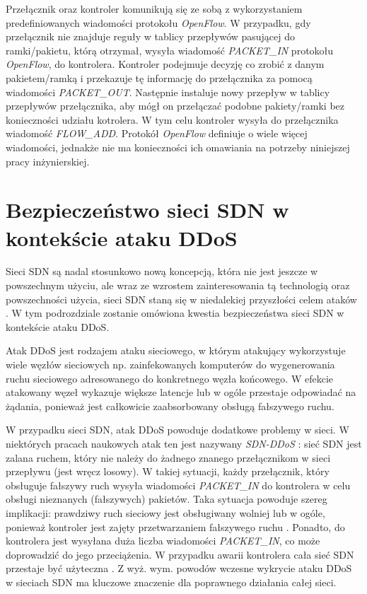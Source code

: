 Przełącznik oraz kontroler komunikują się ze sobą z wykorzystaniem
predefiniowanych wiadomości protokołu \textit{OpenFlow}. W przypadku, gdy
przełącznik nie znajduje reguły w tablicy przepływów pasującej do ramki/pakietu,
którą otrzymał, wysyła wiadomość \textit{PACKET\_IN} protokołu
\textit{OpenFlow}, do kontrolera. Kontroler podejmuje decyzję co zrobić z danym 
pakietem/ramką i przekazuje tę informację do przełącznika za pomocą wiadomości
\textit{PACKET\_OUT}. Następnie instaluje nowy przepływ w tablicy przepływów
przełącznika, aby mógł on przełączać podobne pakiety/ramki bez konieczności
udziału kotrolera. W tym celu kontroler wysyła do przełącznika wiadomość
\textit{FLOW\_ADD}. Protokół \textit{OpenFlow} definiuje o wiele więcej
wiadomości, jednakże nie ma konieczności ich omawiania na potrzeby niniejszej
pracy inżynierskiej.

\section{Bezpieczeństwo sieci SDN w kontekście ataku DDoS}

Sieci SDN są nadal stosunkowo nową koncepcją, która nie jest jeszcze w
powszechnym użyciu, ale wraz ze wzrostem zainteresowania tą technologią oraz
powszechności użycia, sieci SDN staną się w niedalekiej przyszłości celem ataków
\cite{sdnsecurityblog}. W tym podrozdziale zostanie omówiona kwestia
bezpieczeństwa sieci SDN w kontekście ataku DDoS.

Atak DDoS jest rodzajem ataku sieciowego, w którym atakujący wykorzystuje wiele
węzłów sieciowych np. zainfekowanych komputerów do wygenerowania ruchu
sieciowego adresowanego do konkretnego węzła końcowego. W efekcie atakowany
węzeł wykazuje większe latencje lub w ogóle przestaje odpowiadać na żądania,
ponieważ jest całkowicie zaabsorbowany obsługą fałszywego ruchu.

W przypadku sieci SDN, atak DDoS powoduje dodatkowe problemy w sieci. W
niektórych pracach naukowych atak ten jest nazywany \textit{SDN-DDoS}
\cite{ddosbronksarticle}: sieć SDN jest zalana ruchem, który nie należy do
żadnego znanego przełącznikom w sieci przepływu (jest wręcz losowy). W takiej
sytuacji, każdy przełącznik, który obsługuje fałszywy ruch wysyła wiadomości
\textit{PACKET\_IN} do kontrolera w celu obsługi nieznanych (fałszywych)
pakietów. Taka sytuacja powoduje szereg implikacji: prawdziwy ruch sieciowy jest
obsługiwany wolniej lub w ogóle, ponieważ kontroler jest zajęty przetwarzaniem
fałszywego ruchu \cite{indiaarticle}. Ponadto, do kontrolera jest wysyłana duża
liczba wiadomości \textit{PACKET\_IN}, co może doprowadzić do jego przeciążenia.
W przypadku awarii kontrolera cała sieć SDN przestaje być użyteczna
\cite{ddoskoreaarticle}. Z wyż. wym. powodów wczesne wykrycie ataku DDoS w
sieciach SDN ma kluczowe znaczenie dla poprawnego działania całej sieci. 

